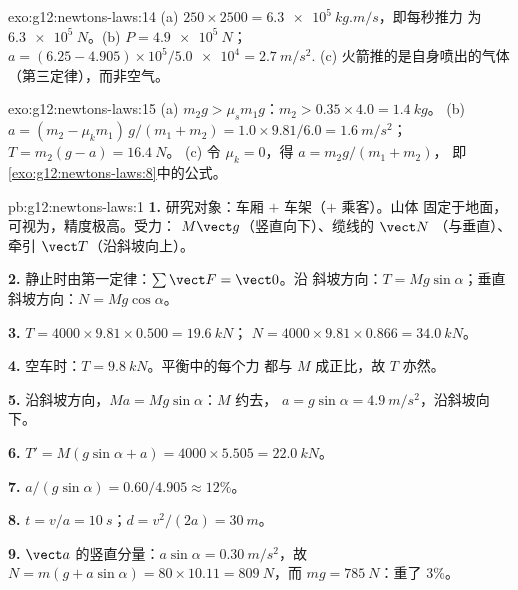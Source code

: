\begin{solution}{exo:g12:newtons-laws:14}
(a) $250 \times 2500 = \qty{6.3e5}{kg.m/s}$，即每秒推力
为 $\qty{6.3e5}{N}$。(b) $P = \qty{4.9e5}{N}$；
$a = (6.25 - 4.905) \times 10^5 / \num{5.0e4} = \qty{2.7}{m/s^2}$.
(c) 火箭推的是自身喷出的气体（第三定律），而非空气。
\end{solution}

\begin{solution}{exo:g12:newtons-laws:15}
(a) $m_2 g > \mu_s m_1 g$：$m_2 > 0.35 \times 4.0 = \qty{1.4}{kg}$。
(b) $a = (m_2 - \mu_k m_1)\,g/(m_1 + m_2) = 1.0 \times 9.81/6.0 =
\qty{1.6}{m/s^2}$；$T = m_2(g - a) = \qty{16.4}{N}$。
(c) 令 $\mu_k = 0$，得 $a = m_2 g/(m_1 + m_2)$，
即\cref{exo:g12:newtons-laws:8}中的公式。
\end{solution}

\begin{solution}{pb:g12:newtons-laws:1}
\textbf{1.} 研究对象：车厢 $+$ 车架（$+$ 乘客）。山体
固定于地面，可视为，精度极高。受力：
 $M\vect g$（竖直向下）、缆线的 $\vect N$
（与垂直）、牵引 $\vect T$（沿斜坡向上）。

\textbf{2.} 静止时由第一定律：$\sum \vect F = \vect 0$。沿
斜坡方向：$T = Mg\sin\alpha$；垂直斜坡方向：$N = Mg\cos\alpha$。

\textbf{3.} $T = 4000 \times 9.81 \times 0.500 = \qty{19.6}{kN}$；
$N = 4000 \times 9.81 \times 0.866 = \qty{34.0}{kN}$。

\textbf{4.} 空车时：$T = \qty{9.8}{kN}$。平衡中的每个力
都与 $M$ 成正比，故 $T$ 亦然。

\textbf{5.} 沿斜坡方向，$Ma = Mg\sin\alpha$：$M$ 约去，
$a = g\sin\alpha = \qty{4.9}{m/s^2}$，沿斜坡向下。

\textbf{6.} $T' = M(g\sin\alpha + a) = 4000 \times 5.505 =
\qty{22.0}{kN}$。

\textbf{7.} $a/(g\sin\alpha) = 0.60/4.905 \approx 12\%$。

\textbf{8.} $t = v/a = \qty{10}{s}$；$d = v^2/(2a) = \qty{30}{m}$。

\textbf{9.} $\vect a$ 的竖直分量：$a\sin\alpha =
\qty{0.30}{m/s^2}$，故 $N = m(g + a\sin\alpha) = 80 \times 10.11 =
\qty{809}{N}$，而 $mg = \qty{785}{N}$：重了 $3\%$。


\end{solution}
